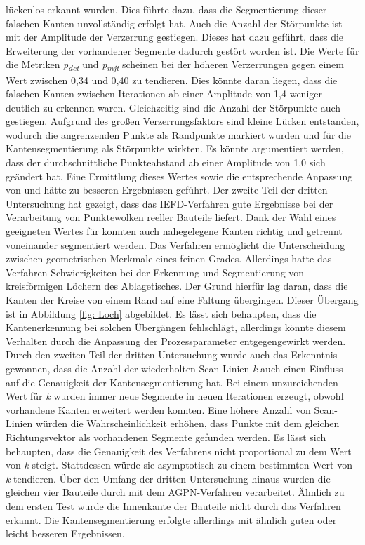 lückenlos erkannt wurden. Dies führte dazu, dass die Segmentierung dieser falschen Kanten unvollständig erfolgt hat. Auch die Anzahl der Störpunkte ist mit der Amplitude der Verzerrung gestiegen. Dieses hat dazu geführt, dass die Erweiterung der vorhandener Segmente dadurch gestört worden ist. Die Werte für die Metriken  \textit{p\textsubscript{dct}} und \textit{p\textsubscript{mjt}} scheinen bei der höheren Verzerrungen gegen einem Wert zwischen 0,34 und 0,40 zu tendieren. Dies könnte daran liegen, dass die falschen Kanten zwischen Iterationen ab einer Amplitude von 1,4 weniger deutlich zu erkennen waren. Gleichzeitig sind die Anzahl der Störpunkte auch gestiegen. Aufgrund des großen Verzerrungsfaktors sind kleine Lücken entstanden, wodurch die angrenzenden Punkte als Randpunkte markiert wurden und für die Kantensegmentierung als Störpunkte wirkten. Es könnte argumentiert werden, dass der durchschnittliche Punkteabstand ab einer Amplitude von 1,0 sich geändert hat. Eine Ermittlung dieses Wertes sowie die entsprechende Anpassung von \distthresha und \distthreshb hätte zu besseren Ergebnissen geführt. Der zweite Teil der dritten Untersuchung hat gezeigt, dass das IEFD-Verfahren gute Ergebnisse bei der Verarbeitung von Punktewolken reeller Bauteile liefert. Dank der Wahl eines geeigneten Wertes für \distthreshb konnten auch nahegelegene Kanten richtig und getrennt voneinander segmentiert werden. Das Verfahren ermöglicht die Unterscheidung zwischen geometrischen Merkmale eines feinen Grades. Allerdings hatte das Verfahren Schwierigkeiten bei der Erkennung und Segmentierung von kreisförmigen Löchern des Ablagetisches. Der Grund hierfür lag daran, dass die Kanten der Kreise von einem Rand auf eine Faltung übergingen. Dieser Übergang ist in Abbildung \ref{fig: Loch} abgebildet. Es lässt sich behaupten, dass die Kantenerkennung bei solchen Übergängen fehlschlägt, allerdings könnte diesem Verhalten durch die Anpassung der Prozessparameter entgegengewirkt werden. Durch den zweiten Teil der dritten Untersuchung wurde auch das Erkenntnis gewonnen, dass die Anzahl der wiederholten Scan-Linien \textit{k} auch einen Einfluss auf die Genauigkeit der Kantensegmentierung hat. Bei einem unzureichenden Wert für \textit{k} wurden immer neue Segmente in neuen Iterationen erzeugt, obwohl vorhandene Kanten erweitert werden konnten. Eine höhere Anzahl von Scan-Linien würden die Wahrscheinlichkeit erhöhen, dass Punkte mit dem gleichen Richtungsvektor als vorhandenen Segmente gefunden werden. Es lässt sich behaupten, dass die Genauigkeit des Verfahrens nicht proportional zu dem Wert von \textit{k} steigt. Stattdessen würde sie asymptotisch zu einem bestimmten Wert von \textit{k} tendieren. Über den Umfang der dritten Untersuchung hinaus wurden die gleichen vier Bauteile durch mit dem AGPN-Verfahren verarbeitet. Ähnlich zu dem ersten Test wurde die Innenkante der Bauteile nicht durch das Verfahren erkannt. Die Kantensegmentierung erfolgte allerdings mit ähnlich guten oder leicht besseren Ergebnissen. 


